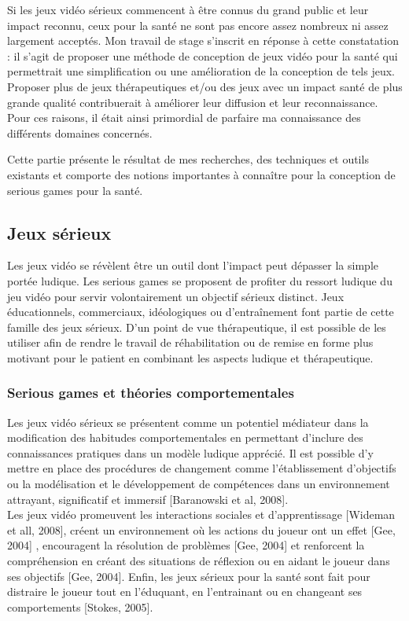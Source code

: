 Si les jeux vidéo sérieux commencent à être connus du grand public et leur impact reconnu, ceux pour la santé ne sont pas encore assez nombreux ni assez largement acceptés. Mon travail de stage s'inscrit en réponse à cette constatation : il s'agit de proposer une méthode de conception de jeux vidéo pour la santé qui permettrait une simplification ou une amélioration de la conception de tels jeux. Proposer plus de jeux  thérapeutiques et/ou des jeux avec un impact santé de plus grande qualité contribuerait à améliorer leur diffusion et leur reconnaissance. Pour ces raisons, il était ainsi primordial de parfaire ma connaissance des différents domaines concernés.

Cette partie présente le résultat de mes recherches, des techniques et outils existants et comporte des notions importantes à connaître pour la conception de serious games pour la santé.




	\subsection{Jeux sérieux}
Les jeux vidéo se révèlent être un outil dont l’impact peut dépasser la simple portée ludique. Les serious games se proposent de profiter du ressort ludique du jeu vidéo pour servir volontairement un objectif sérieux distinct. Jeux éducationnels, commerciaux, idéologiques ou d’entraînement font partie de cette famille des jeux sérieux. D’un point de vue thérapeutique, il est possible de les utiliser afin de rendre le travail de réhabilitation ou de remise en forme plus motivant pour le patient en combinant les aspects ludique et thérapeutique.

		\subsubsection{Serious games et théories comportementales}
Les jeux vidéo sérieux se présentent comme un potentiel médiateur dans la modification des habitudes comportementales en permettant d’inclure des connaissances pratiques dans un modèle ludique apprécié. Il est possible d’y mettre en place des procédures de changement comme l’établissement d’objectifs ou la modélisation et le développement de compétences dans un environnement attrayant, significatif et immersif [Baranowski et al, 2008]\cite{Bara08}. \\
Les jeux vidéo promeuvent les interactions sociales et d’apprentissage [Wideman et all, 2008], créent un environnement où les actions du joueur ont un effet [Gee, 2004]\cite{Gee04} , encouragent la résolution de problèmes [Gee, 2004]\cite{Gee04} et renforcent la compréhension en créant des situations de réflexion ou en aidant le joueur dans ses objectifs [Gee, 2004]\cite{Gee04}. Enfin, les jeux sérieux pour la santé sont fait pour distraire le joueur tout en l’éduquant, en l’entrainant ou en changeant ses comportements [Stokes, 2005]\cite{Stok05}.

